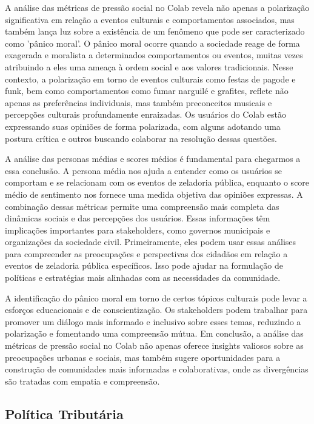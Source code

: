 A análise das métricas de pressão social no Colab revela não apenas a polarização significativa em relação a eventos culturais e comportamentos associados, mas também lança luz sobre a existência de um fenômeno que pode ser caracterizado como 'pânico moral'. O pânico moral ocorre quando a sociedade reage de forma exagerada e moralista a determinados comportamentos ou eventos, muitas vezes atribuindo a eles uma ameaça à ordem social e aos valores tradicionais. Nesse contexto, a polarização em torno de eventos culturais como festas de pagode e funk, bem como comportamentos como fumar narguilé e grafites, reflete não apenas as preferências individuais, mas também preconceitos musicais e percepções culturais profundamente enraizadas. Os usuários do Colab estão expressando suas opiniões de forma polarizada, com alguns adotando uma postura crítica e outros buscando colaborar na resolução dessas questões.

A análise das personas médias e scores médios é fundamental para chegarmos a essa conclusão. A persona média nos ajuda a entender como os usuários se comportam e se relacionam com os eventos de zeladoria pública, enquanto o score médio de sentimento nos fornece uma medida objetiva das opiniões expressas. A combinação dessas métricas permite uma compreensão mais completa das dinâmicas sociais e das percepções dos usuários. Essas informações têm implicações importantes para stakeholders, como governos municipais e organizações da sociedade civil. Primeiramente, eles podem usar essas análises para compreender as preocupações e perspectivas dos cidadãos em relação a eventos de zeladoria pública específicos. Isso pode ajudar na formulação de políticas e estratégias mais alinhadas com as necessidades da comunidade.

A identificação do pânico moral em torno de certos tópicos culturais pode levar a esforços educacionais e de conscientização. Os stakeholders podem trabalhar para promover um diálogo mais informado e inclusivo sobre esses temas, reduzindo a polarização e fomentando uma compreensão mútua. Em conclusão, a análise das métricas de pressão social no Colab não apenas oferece insights valiosos sobre as preocupações urbanas e sociais, mas também sugere oportunidades para a construção de comunidades mais informadas e colaborativas, onde as divergências são tratadas com empatia e compreensão.

\subsection{Política Tributária}
\label{sec:eventos_populares_taxes}

